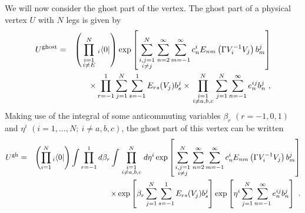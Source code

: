 \documentclass[a4paper,11pt]{article}
\begin{document}
We will now consider the ghost part of the vertex. The ghost part of a physical vertex $U$ with $N$ legs is given by
\begin{eqnarray}
U^{\rm ghost} & = & \left( \prod_{\scriptstyle i=1\atop \scriptstyle i\neq E}^{N}{ }_i\langle 0|\right) \exp \left[ \sum_{\scriptstyle i,j=1\atop \scriptstyle i\neq j}^N\sum_{n=2}^\infty \sum_{m=-1}^\infty c_n^iE_{nm}\left( \Gamma V^{-1}_iV_j\right) b_m^j\right] \nonumber \\ 
 & & \times \prod_{r=-1}^1\sum_{j=1}^N\sum_{s=-1}^1E_{rs}(V_j)b_s^j\times \prod_{\scriptstyle i=1\atop \scriptstyle i\neq a,b,c}^N\sum_{j=1}^N\sum_{n=-1}^\infty e_n^{ij}b_n^j\ ,
\end{eqnarray}
Making use of the integral of some anticommuting variables $\beta _r$ $(r=-1,0,1)$ and $\eta ^i$ $(i=1,\dots ,N;\ i\neq a,b,c)$, the ghost part of this vertex can be written \cite{cg2}
\begin{eqnarray}
U^{\rm gh}& = & \left( \prod_{i=1}^N{ }_i\langle 0|\right) \int \prod_{r=-1}^1d\beta _r\int \prod_{\scriptstyle i=1\atop \scriptstyle i\neq a,b,c}^Nd\eta ^i \exp \left[ \sum_{\scriptstyle i,j=1\atop \scriptstyle i\neq j}^N\sum_{n=2}^\infty \sum_{m=-1}^\infty c_n^iE_{nm}\left( \Gamma V^{-1}_iV_j\right) b_m^j\right] \nonumber \\
 & & \times \exp \left[ \beta _r\sum_{j=1}^N\sum_{s=-1}^1E_{rs}(V_j)b_s^j\right] \exp \left[ \eta ^i\sum_{j=1}^N\sum_{n=-1}^\infty e_n^{ij}b_n^j\right] \ .
\end{eqnarray}
\end{document}
